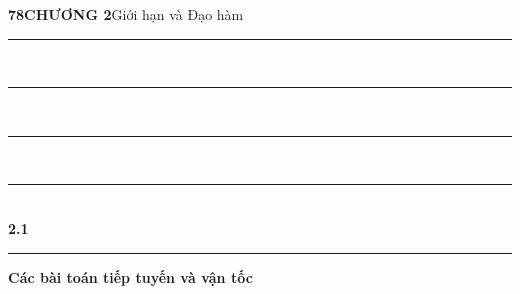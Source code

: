 \noindent
{\small\sffamily\textbf{78}\hspace{2.2cm}\textbf{CHƯƠNG 2}\hspace{0.6cm}Giới hạn và Đạo hàm}\par
\vspace{12pt}

\noindent
\begin{minipage}[b]{45mm}
  \raggedleft
  {\color{stewartblue}%
  \rule{36mm}{0.6pt}\\[2.5pt]
  \rule{36mm}{0.6pt}\\[2.5pt]
  \rule{36mm}{0.6pt}\\[2.5pt]
  \rule{36mm}{0.6pt}}\\[2pt]
  {\fontsize{28}{32}\selectfont\bfseries\sffamily\color{stewartblue}2.1}\hspace{2mm}
\end{minipage}%
\hspace{1.5mm}%
\textcolor{stewartblue}{\rule[-3pt]{1.5pt}{32pt}}%
\hspace{4mm}%
\begin{minipage}[b]{133mm}
  \raggedright
  {\fontsize{19}{23}\selectfont\bfseries\sffamily Các bài toán tiếp tuyến và vận tốc}\par
  \vspace{3pt}
\end{minipage}

\vspace{10pt}

